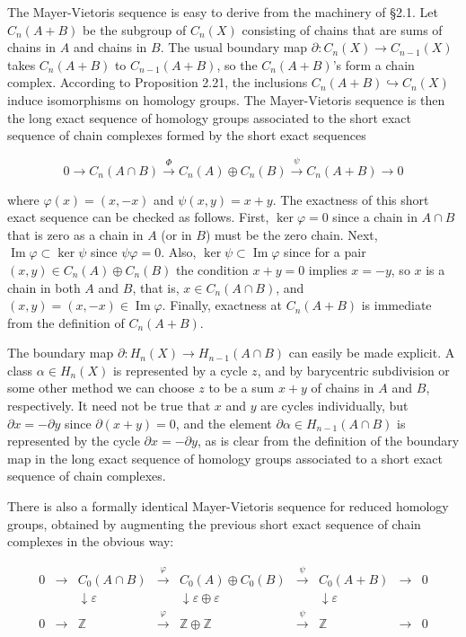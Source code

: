 The Mayer-Vietoris sequence is easy to derive from the machinery of \S2.1. Let $C_n(A+B)$ be the subgroup of $C_n(X)$ consisting of chains that are sums of chains in $A$ and chains in $B$. The usual boundary map $\partial : C_n(X) \to C_{n-1}(X)$ takes $C_n(A+B)$ to $C_{n-1}(A+B)$, so the $C_n(A+B)$'s form a chain complex. According to Proposition 2.21, the inclusions $C_n(A+B) \hookrightarrow C_n(X)$ induce isomorphisms on homology groups. The Mayer-Vietoris sequence is then the long exact sequence of homology groups associated to the short exact sequence of chain complexes formed by the short exact sequences

\[ 0 \to C_n(A \cap B) \xrightarrow{\Phi} C_n(A) \oplus C_n(B) \xrightarrow{\psi} C_n(A+B) \to 0 \]

where $\varphi(x) = (x,-x)$ and $\psi(x,y) = x + y$. The exactness of this short exact sequence can be checked as follows. First, $\ker \varphi = 0$ since a chain in $A \cap B$ that is zero as a chain in $A$ (or in $B$) must be the zero chain. Next, $\operatorname{Im} \varphi \subset \ker \psi$ since $\psi\varphi = 0$. Also, $\ker \psi \subset \operatorname{Im} \varphi$ since for a pair $(x,y) \in C_n(A) \oplus C_n(B)$ the condition $x + y = 0$ implies $x = -y$, so $x$ is a chain in both $A$ and $B$, that is, $x \in C_n(A \cap B)$, and $(x,y) = (x,-x) \in \operatorname{Im} \varphi$. Finally, exactness at $C_n(A + B)$ is immediate from the definition of $C_n(A + B)$.

The boundary map $\partial: H_n(X) \to H_{n-1}(A \cap B)$ can easily be made explicit. A class $\alpha \in H_n(X)$ is represented by a cycle $z$, and by barycentric subdivision or some other method we can choose $z$ to be a sum $x + y$ of chains in $A$ and $B$, respectively. It need not be true that $x$ and $y$ are cycles individually, but $\partial x = -\partial y$ since $\partial(x + y) = 0$, and the element $\partial \alpha \in H_{n-1}(A \cap B)$ is represented by the cycle $\partial x = -\partial y$, as is clear from the definition of the boundary map in the long exact sequence of homology groups associated to a short exact sequence of chain complexes.

There is also a formally identical Mayer-Vietoris sequence for reduced homology groups, obtained by augmenting the previous short exact sequence of chain complexes in the obvious way:

\[
\begin{array}{ccccccccc}
0 & \to & C_0(A \cap B) & \xrightarrow{\varphi} & C_0(A) \oplus C_0(B) & \xrightarrow{\psi} & C_0(A + B) & \to & 0 \\
& & \downarrow \varepsilon & & \downarrow \varepsilon \oplus \varepsilon & & \downarrow \varepsilon & & \\
0 & \to & \mathbb{Z} & \xrightarrow{\varphi} & \mathbb{Z} \oplus \mathbb{Z} & \xrightarrow{\psi} & \mathbb{Z} & \to & 0
\end{array}
\]

